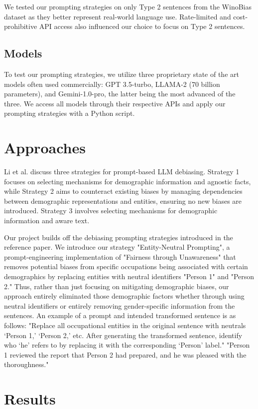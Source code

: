 \documentclass{article}
\begin{document}
We tested our prompting strategies on only Type 2 sentences from the WinoBias dataset as they better represent real-world language use. Rate-limited and cost-prohibitive API access also influenced our choice to focus on Type 2 sentences.

\subsection{Models}
To test our prompting strategies, we utilize three proprietary state of the art models often used commercially: GPT 3.5-turbo, LLAMA-2 (70 billion parameters), and Gemini-1.0-pro, the latter being the most advanced of the three. We access all models through their respective APIs and apply our prompting strategies with a Python script. 

\section{Approaches}
Li et al. discuss three strategies for prompt-based LLM debiasing. Strategy 1 focuses on selecting mechanisms for demographic information and agnostic facts, while Strategy 2 aims to counteract existing biases by managing dependencies between demographic representations and entities, ensuring no new biases are introduced. Strategy 3 involves selecting mechanisms for demographic information and aware text.

Our project builds off the debiasing prompting strategies introduced in the reference paper. We introduce our strategy "Entity-Neutral Prompting", a prompt-engineering implementation of "Fairness through Unawareness" that removes potential biases from specific occupations being associated with certain demographics by replacing entities with neutral identifiers "Person 1" and "Person 2." Thus, rather than just focusing on mitigating demographic biases, our approach entirely eliminated those demographic factors whether through using neutral identifiers or entirely removing gender-specific information from the sentences. An example of a prompt and intended transformed sentence is as follows: "Replace all occupational entities in the original sentence with neutrals ‘Person 1,’ ‘Person 2,’ etc. After generating the transformed sentence, identify who ‘he’ refers to by replacing it with the corresponding ‘Person’ label." "Person 1 reviewed the report that Person 2 had prepared, and he was pleased with the thoroughness."

\section{Results}
\end{document}
